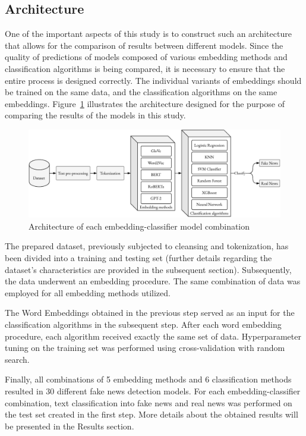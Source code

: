 \subsection{Architecture}

One of the important aspects of this study is to construct such an architecture that allows for the comparison of results between different models. Since the quality of predictions of models composed of various embedding methods and classification algorithms is being compared, it is necessary to ensure that the entire process is designed correctly. The individual variants of embeddings should be trained on the same data, and the classification algorithms on the same embeddings. Figure~\ref{methodology-schema_extended} illustrates the architecture designed for the purpose of comparing the results of the models in this study.

\begin{figure}[h]
\centering
\includegraphics[width=0.95\linewidth]{methodology-schema_gpt2_extended.pdf}
\caption{Architecture of each embedding-classifier model combination}
\label{methodology-schema_extended}
\end{figure}

The prepared dataset, previously subjected to cleansing and tokenization, has been divided into a training and testing set (further details regarding the dataset's characteristics are provided in the subsequent section). Subsequently, the data underwent an embedding procedure. The same combination of data was employed for all embedding methods utilized.

The Word Embeddings obtained in the previous step served as an input for the classification algorithms in the subsequent step. After each word embedding procedure, each algorithm received exactly the same set of data. Hyperparameter tuning on the training set was performed using cross-validation with random search.

Finally, all combinations of 5 embedding methods and 6 classification methods resulted in 30 different fake news detection models. For each embedding-classifier combination, text classification into fake news and real news was performed on the test set created in the first step. More details about the obtained results will be presented in the Results section.

